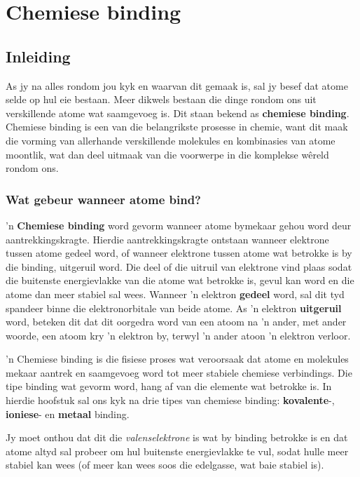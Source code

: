          \chapter{Chemiese binding}
    \setcounter{figure}{1}
    \setcounter{subfigure}{1}
    \label{m38704*cid1}
            \section{Inleiding}
            \nopagebreak

As jy na alles rondom jou kyk en waarvan dit gemaak is, sal jy besef dat atome selde op hul  eie bestaan. Meer dikwels bestaan die dinge rondom ons ​​uit verskillende atome wat saamgevoeg is. Dit staan bekend as \textbf{chemiese binding}. Chemiese binding is een van die belangrikste prosesse in chemie, want dit maak die vorming van allerhande verskillende molekules en kombinasies van atome moontlik, wat dan deel uitmaak van die voorwerpe in die komplekse w\^{e}reld rondom ons. \par 
{}
    \label{m38704*cid4}
            \subsection*{Wat gebeur wanneer atome bind?}
            \nopagebreak
      \label{m38704*id138842} 'n \textbf{Chemiese binding} word gevorm wanneer atome bymekaar gehou word deur aantrekkingskragte. Hierdie aantrekkingskragte ontstaan wanneer elektrone tussen atome gedeel word, of wanneer elektrone tussen atome wat betrokke is by die binding, uitgeruil word. Die deel of die uitruil van elektrone vind plaas sodat die buitenste energievlakke van die atome wat betrokke is, gevul kan word en die atome dan meer stabiel sal wees. Wanneer 'n elektron \textbf{gedeel} word, sal dit tyd spandeer binne die elektronorbitale van beide atome. As 'n elektron \textbf{uitgeruil} word, beteken dit dat dit oorgedra word van een atoom na 'n ander, met ander woorde, een atoom kry 'n elektron by, terwyl  'n ander atoon  'n elektron verloor.\par 
\label{m38704*fhsst!!!underscore!!!id83}
 { 'n Chemiese binding is die fisiese proses wat veroorsaak dat atome en molekules mekaar aantrek en saamgevoeg word tot meer stabiele chemiese verbindings.} 
      \label{m38704*id138909}Die tipe binding wat gevorm word, hang af van die elemente wat betrokke is. In hierdie hoofstuk
sal ons kyk na drie tipes van chemiese binding: \textbf{kovalente}-, \textbf{ioniese}- en \textbf{metaal} binding.\par 
      \label{m38704*id138929}
Jy moet onthou dat dit die \textsl{valenselektrone} is wat by binding betrokke is en dat atome altyd sal probeer om hul buitenste energievlakke te vul, sodat hulle meer stabiel kan wees (of meer kan wees soos die edelgasse, wat baie stabiel is).\par 
